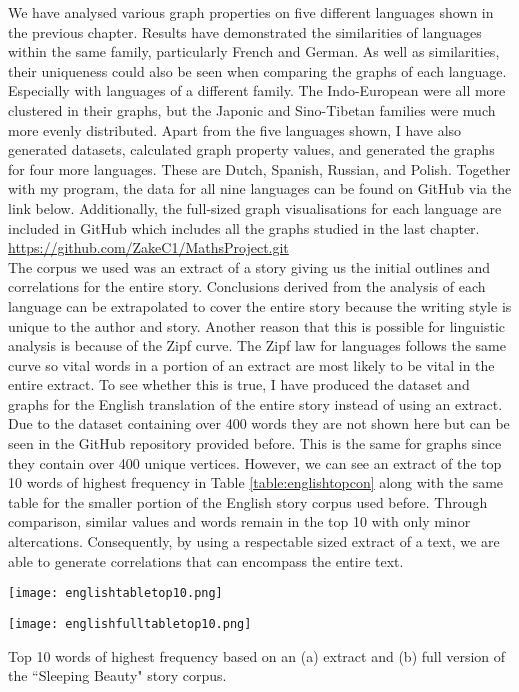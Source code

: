 We have analysed various graph properties on five different languages shown in the previous chapter. Results have demonstrated the similarities of languages within the same family, particularly French and German. As well as similarities, their uniqueness could also be seen when comparing the graphs of each language. Especially with languages of a different family. The Indo-European were all more clustered in their graphs, but the Japonic and Sino-Tibetan families were much more evenly distributed. Apart from the five languages shown, I have also generated datasets, calculated graph property values, and generated the graphs for four more languages. These are Dutch, Spanish, Russian, and Polish. Together with my program, the data for all nine languages can be found on GitHub via the link below. Additionally, the full-sized graph visualisations for each language are included in GitHub which includes all the graphs studied in the last chapter.\\

\url{https://github.com/ZakeC1/MathsProject.git}\\

The corpus we used was an extract of a story giving us the initial outlines and correlations for the entire story. Conclusions derived from the analysis of each language can be extrapolated to cover the entire story because the writing style is unique to the author and story. Another reason that this is possible for linguistic analysis is because of the Zipf curve. The Zipf law for languages follows the same curve so vital words in a portion of an extract are most likely to be vital in the entire extract. To see whether this is true, I have produced the dataset and graphs for the English translation of the entire story instead of using an extract. Due to the dataset containing over 400 words they are not shown here but can be seen in the GitHub repository provided before. This is the same for graphs since they contain over 400 unique vertices. However, we can see an extract of the top 10 words of highest frequency in Table \ref{table:englishtopcon} along with the same table for the smaller portion of the English story corpus used before. Through comparison, similar values and words remain in the top 10 with only minor altercations. Consequently, by using a respectable sized extract of a text, we are able to generate correlations that can encompass the entire text.

\begin{table}[!htb]
\centering
\begin{subtable}{.45\textwidth}
	\centering
	\texttt{[image: englishtabletop10.png]}
	\caption{}
\end{subtable}
\hfill
\begin{subtable}{.45\textwidth}
	\centering
	\texttt{[image: englishfulltabletop10.png]}
	\caption{}
\end{subtable}
\caption{Top 10 words of highest frequency based on an (a) extract and (b) full version of the ``Sleeping Beauty" story corpus.}
\label{table:englishtopcon}
\end{table}

